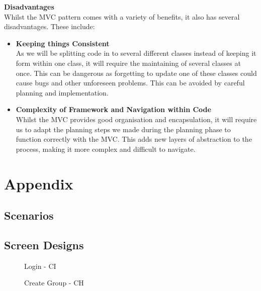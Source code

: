 \documentclass[a4paper]{article}
\begin{document}
\textbf{Disadvantages} \\
Whilst the MVC pattern comes with a variety of benefits, it also has several disadvantages. These include:
\begin{itemize}
    \item \textbf{Keeping things Consistent} \\
    As we will be splitting code in to several different classes instead of keeping it form within one class, it will require the maintaining of several classes at once. This can be dangerous as forgetting to update one of these classes could cause bugs and other unforeseen problems. This can be avoided by careful planning and implementation. \\
    \item \textbf{Complexity of Framework and Navigation within Code} \\
    Whilst the MVC provides good organisation and encapsulation, it will require us to adapt the planning steps we made during the planning phase to function correctly with the MVC. This adds new layers of abstraction to the process, making it more complex and difficult to navigate.
\end{itemize}

\section{Appendix}
\subsection{Scenarios}




\clearpage
\subsection{Screen Designs}
\begin{figure}[!ht] %
    \centering{} %
    \caption{Login - CI}
    \label{fig:login}
\end{figure}

\begin{figure}[!ht] %
    \centering{} %
    \caption{Create Group - CH}
    \label{fig:create_group}
\end{figure}
\end{document}
